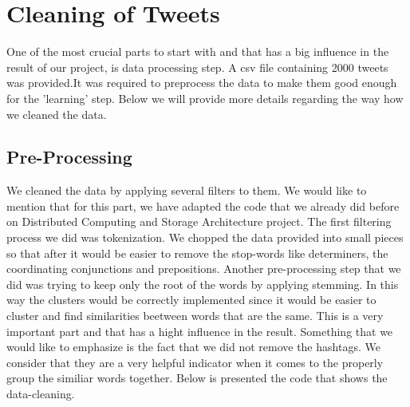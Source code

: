 \documentclass{article}
\begin{document}
        \section{ Cleaning of Tweets }
One of the most crucial parts to start with and that has a big influence in the result of our project, is data processing step. A csv file containing 2000 tweets was provided.It was required to preprocess the data to make them good enough for the 'learning' step. Below we will provide more details regarding the way how we cleaned the data. 
        
        \subsection{Pre-Processing}

        We cleaned the data by applying several filters to them. We would like to mention that for this part, we have adapted the code that we already did before on Distributed Computing and Storage Architecture project. 
        The first filtering process we did was tokenization. We chopped the data provided into small pieces so that after it would be easier to remove the stop-words like determiners, the coordinating conjunctions and prepositions.
         Another pre-processing step that we did was trying to keep only the root of the words by applying stemming. In this way the clusters would be correctly implemented since it would be easier to cluster and find similarities beetween words that are the same. This is a very important part and that has a hight influence in the result. 
         Something that we would like to emphasize is the fact that we did not remove the hashtags. We consider that they are a very helpful indicator when it comes to the properly group the similiar words together. Below is presented the code that shows the data-cleaning. 
         
\end{document}
